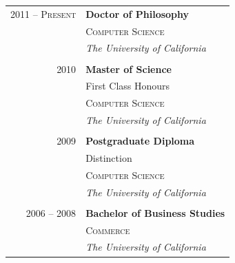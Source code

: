 \documentclass[10pt]{article}
\begin{document}
{\begin{minipage}[t]{0.44\textwidth}
\begin{tabular}{rl} %


2011 -- \textsc{Present} & \textbf{Doctor of Philosophy} \\ 
& \textsc{Computer Science} \\ 
& \textit{The University of California}\\
&\\
	 

2010 & \textbf{Master of Science} \\ 
& \small First Class Honours \\
& \textsc{Computer Science} \\ 
& \textit{The University of California}\\
&\\
	 

2009 & \textbf{Postgraduate Diploma}\\
& \small Distinction \\
& \textsc{Computer Science} \\
& \textit{The University of California}\\
&\\
	 

2006 -- 2008 & \textbf{Bachelor of Business Studies}\\
& \textsc{Commerce} \\
& \textit{The University of California} 
	

\end{tabular}\\[10pt]



\end{minipage}}
\end{document}
